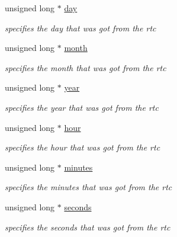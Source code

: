 \begin{DoxyCompactItemize}
unsigned long $\ast$ \hyperlink{struct_game_a47e819829ec45fd80f4994e3e07bd464}{day}
\begin{DoxyCompactList}\small\item\em specifies the day that was got from the rtc \end{DoxyCompactList}\item 
unsigned long $\ast$ \hyperlink{struct_game_ab0060eb6fa8a06edfb9a93b2eb1057f6}{month}
\begin{DoxyCompactList}\small\item\em specifies the month that was got from the rtc \end{DoxyCompactList}\item 
unsigned long $\ast$ \hyperlink{struct_game_a30df4f508d48870f42ddeb4f1519c737}{year}
\begin{DoxyCompactList}\small\item\em specifies the year that was got from the rtc \end{DoxyCompactList}\item 
unsigned long $\ast$ \hyperlink{struct_game_a8e1dd8c104588f46888076276ca85156}{hour}
\begin{DoxyCompactList}\small\item\em specifies the hour that was got from the rtc \end{DoxyCompactList}\item 
unsigned long $\ast$ \hyperlink{struct_game_a89704c83034c5498c532304b4a6a0f15}{minutes}
\begin{DoxyCompactList}\small\item\em specifies the minutes that was got from the rtc \end{DoxyCompactList}\item 
unsigned long $\ast$ \hyperlink{struct_game_a8cd7bab31a211893fd0eced50c2937ad}{seconds}
\begin{DoxyCompactList}\small\item\em specifies the seconds that was got from the rtc \end{DoxyCompactList}\end{DoxyCompactItemize}

